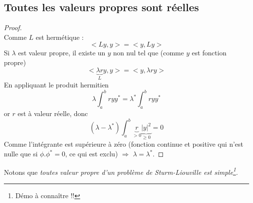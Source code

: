 \documentclass[11pt, a4paper, openany]{book}
\begin{document}
		\subsection{Toutes les valeurs propres sont réelles}
		\begin{proof}
			\ \\
			Comme $L$ est hermétique :
			\begin{equation}
				<Ly,y> = <y,Ly>
			\end{equation}
			Si $\lambda$ est valeur propre, il existe un $y$ non nul tel que (comme $y$ est fonction propre)
			\begin{equation}
				<\underbrace{\lambda r}_{L}y, y> = <y, \lambda r y>
			\end{equation}
			En appliquant le produit hermitien
			\begin{equation}
				\lambda \int_a^b r yy^* = \lambda^* \int_a^b r yy^*
			\end{equation}
			or $r$ est à valeur réelle, donc
			\begin{equation}
				(\lambda-\lambda^*) \int_a^b \underbrace{r}_{>0} \underbrace{|y|^2}_{\geq 0} = 0
			\end{equation}
			Comme l'intégrante est supérieure à zéro (fonction continue et positive qui n'est nulle que si $\phi.\phi^* = 0$, ce qui est exclu) $\Rightarrow$ $\lambda = \lambda^*$.
		\end{proof}
													
		Notons que \textit{toutes valeur propre d'un problème de Sturm-Liouville est simple\footnote{Démo à connaître !!}.}
													
		\setcounter{subsection}{5}
\end{document}
